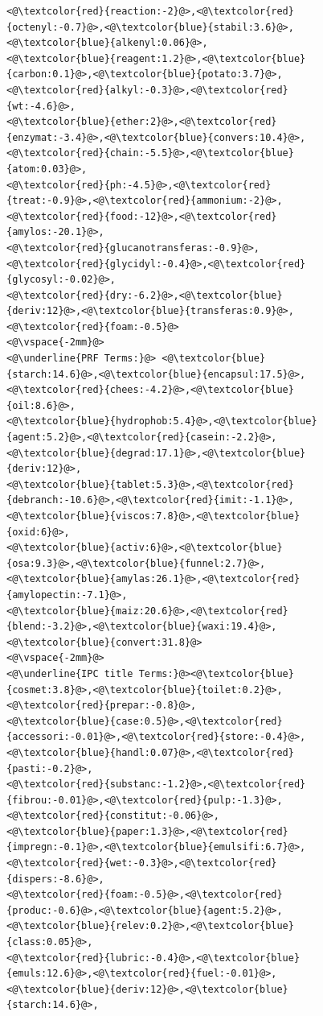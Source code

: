 \begin{figure}[t!]
\begin{framed}
\begin{lstlisting}[basicstyle=\scriptsize\ttfamily , linewidth=\columnwidth,breaklines=true]
<@\textcolor{red}{reaction:-2}@>,<@\textcolor{red}{octenyl:-0.7}@>,<@\textcolor{blue}{stabil:3.6}@>,<@\textcolor{blue}{alkenyl:0.06}@>,
<@\textcolor{blue}{reagent:1.2}@>,<@\textcolor{blue}{carbon:0.1}@>,<@\textcolor{blue}{potato:3.7}@>,<@\textcolor{red}{alkyl:-0.3}@>,<@\textcolor{red}{wt:-4.6}@>,
<@\textcolor{blue}{ether:2}@>,<@\textcolor{red}{enzymat:-3.4}@>,<@\textcolor{blue}{convers:10.4}@>,<@\textcolor{red}{chain:-5.5}@>,<@\textcolor{blue}{atom:0.03}@>,
<@\textcolor{red}{ph:-4.5}@>,<@\textcolor{red}{treat:-0.9}@>,<@\textcolor{red}{ammonium:-2}@>,<@\textcolor{red}{food:-12}@>,<@\textcolor{red}{amylos:-20.1}@>,
<@\textcolor{red}{glucanotransferas:-0.9}@>,<@\textcolor{red}{glycidyl:-0.4}@>,<@\textcolor{red}{glycosyl:-0.02}@>,
<@\textcolor{red}{dry:-6.2}@>,<@\textcolor{blue}{deriv:12}@>,<@\textcolor{blue}{transferas:0.9}@>,<@\textcolor{red}{foam:-0.5}@>
<@\vspace{-2mm}@>
<@\underline{PRF Terms:}@> <@\textcolor{blue}{starch:14.6}@>,<@\textcolor{blue}{encapsul:17.5}@>,<@\textcolor{red}{chees:-4.2}@>,<@\textcolor{blue}{oil:8.6}@>,
<@\textcolor{blue}{hydrophob:5.4}@>,<@\textcolor{blue}{agent:5.2}@>,<@\textcolor{red}{casein:-2.2}@>,<@\textcolor{blue}{degrad:17.1}@>,<@\textcolor{blue}{deriv:12}@>,
<@\textcolor{blue}{tablet:5.3}@>,<@\textcolor{red}{debranch:-10.6}@>,<@\textcolor{red}{imit:-1.1}@>,<@\textcolor{blue}{viscos:7.8}@>,<@\textcolor{blue}{oxid:6}@>,
<@\textcolor{blue}{activ:6}@>,<@\textcolor{blue}{osa:9.3}@>,<@\textcolor{blue}{funnel:2.7}@>,<@\textcolor{blue}{amylas:26.1}@>,<@\textcolor{red}{amylopectin:-7.1}@>,
<@\textcolor{blue}{maiz:20.6}@>,<@\textcolor{red}{blend:-3.2}@>,<@\textcolor{blue}{waxi:19.4}@>,<@\textcolor{blue}{convert:31.8}@> 
<@\vspace{-2mm}@>
<@\underline{IPC title Terms:}@><@\textcolor{blue}{cosmet:3.8}@>,<@\textcolor{blue}{toilet:0.2}@>,<@\textcolor{red}{prepar:-0.8}@>,
<@\textcolor{blue}{case:0.5}@>,<@\textcolor{red}{accessori:-0.01}@>,<@\textcolor{red}{store:-0.4}@>,<@\textcolor{blue}{handl:0.07}@>,<@\textcolor{red}{pasti:-0.2}@>,
<@\textcolor{red}{substanc:-1.2}@>,<@\textcolor{red}{fibrou:-0.01}@>,<@\textcolor{red}{pulp:-1.3}@>,<@\textcolor{red}{constitut:-0.06}@>,
<@\textcolor{blue}{paper:1.3}@>,<@\textcolor{red}{impregn:-0.1}@>,<@\textcolor{blue}{emulsifi:6.7}@>,<@\textcolor{red}{wet:-0.3}@>,<@\textcolor{red}{dispers:-8.6}@>,
<@\textcolor{red}{foam:-0.5}@>,<@\textcolor{red}{produc:-0.6}@>,<@\textcolor{blue}{agent:5.2}@>,<@\textcolor{blue}{relev:0.2}@>,<@\textcolor{blue}{class:0.05}@>,
<@\textcolor{red}{lubric:-0.4}@>,<@\textcolor{blue}{emuls:12.6}@>,<@\textcolor{red}{fuel:-0.01}@>,<@\textcolor{blue}{deriv:12}@>,<@\textcolor{blue}{starch:14.6}@>,

\end{lstlisting}
\end{framed}
\end{figure}
